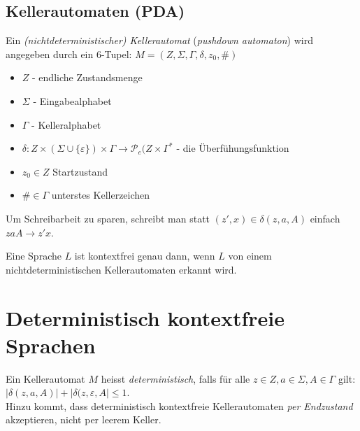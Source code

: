 \documentclass{scrartcl}
\begin{document}
\subsection*{Kellerautomaten (PDA)}
\begin{shaded}
    Ein \emph{(nichtdeterministischer) Kellerautomat} (\emph{pushdown automaton}) wird angegeben durch ein 6-Tupel: $M=\left(Z,\Sigma,\Gamma,\delta,z_0,\#\right) $ \\
    \begin{minipage}[t]{0.48\textwidth}
        \begin{itemize}
            \item $Z$ - endliche Zustandsmenge
            \item $\Sigma$ - Eingabealphabet
            \item $\Gamma$ - Kelleralphabet
        \end{itemize}
    \end{minipage}
    \hfill \vrule \hfill
    \begin{minipage}[t]{0.48\textwidth}
        \begin{itemize}
            \item $ \delta:Z\times(\Sigma\cup\{\varepsilon\})\times\Gamma\to\mathcal{P}_e (Z\times\Gamma^* $ - die Überfühungsfunktion
            \item $z_0\in Z$ Startzustand
            \item $\#\in\Gamma$ unterstes Kellerzeichen
        \end{itemize}
    \end{minipage}
\end{shaded}

Um Schreibarbeit zu sparen, schreibt man statt $(z',x)\in\delta(z,a,A)$ einfach $zaA\to z'x$.

\begin{shaded}
    Eine Sprache $L$ ist kontextfrei genau dann, wenn $L$ von einem nichtdeterministischen Kellerautomaten erkannt wird.
\end{shaded}

\section*{Deterministisch kontextfreie Sprachen}
\begin{shaded}
    Ein Kellerautomat $M$ heisst \emph{deterministisch}, falls für alle $z\in Z,a\in \Sigma, A\in\Gamma$ gilt: $|\delta(z,a,A)| + |\delta(z,\varepsilon,A|\leq 1$. \\
    Hinzu kommt, dass deterministisch kontextfreie Kellerautomaten \emph{per Endzustand} akzeptieren, nicht per leerem Keller.
\end{shaded}
\end{document}
